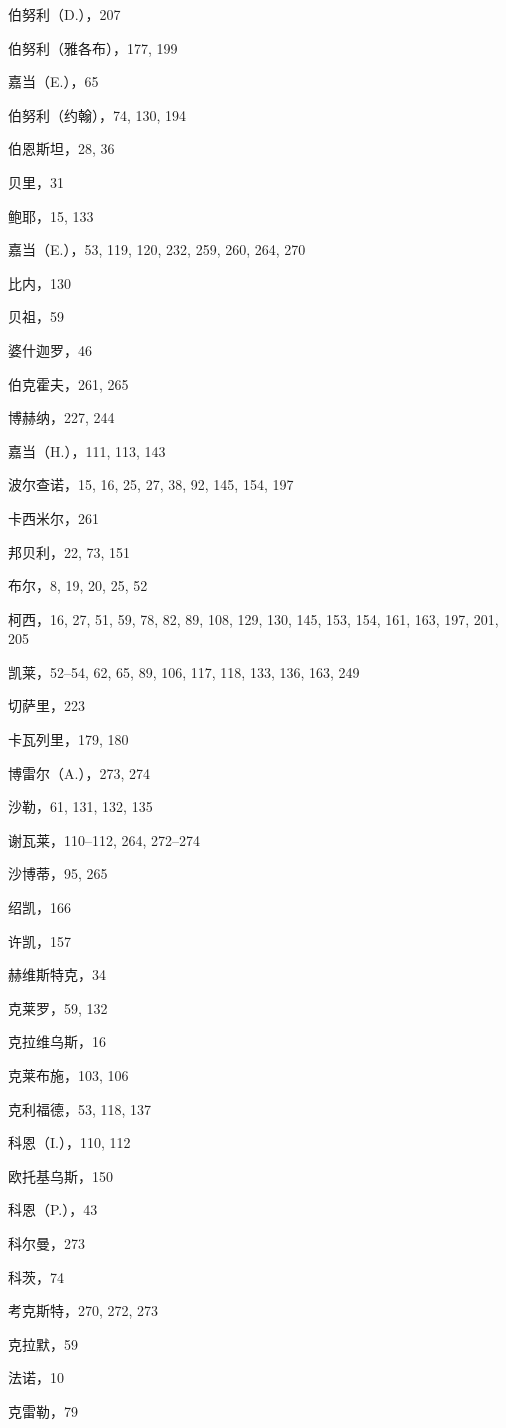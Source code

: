 伯努利（D.），207

伯努利（雅各布），177, 199

嘉当（E.），65

伯努利（约翰），74, 130, 194

伯恩斯坦，28, 36

贝里，31

鲍耶，15, 133

嘉当（E.），53, 119, 120, 232, 259, 260, 264, 270

比内，130

贝祖，59

婆什迦罗，46

伯克霍夫，261, 265

博赫纳，227, 244

嘉当（H.），111, 113, 143

波尔查诺，15, 16, 25, 27, 38, 92, 145, 154, 197

卡西米尔，261

邦贝利，22, 73, 151

布尔，8, 19, 20, 25, 52

柯西，16, 27, 51, 59, 78, 82, 89, 108, 129, 130, 145, 153, 154, 161, 163, 197, 201, 205

凯莱，52--54, 62, 65, 89, 106, 117, 118, 133, 136, 163, 249

切萨里，223

卡瓦列里，179, 180

博雷尔（A.），273, 274

沙勒，61, 131, 132, 135

谢瓦莱，110--112, 264, 272--274

沙博蒂，95, 265

绍凯，166

许凯，157

赫维斯特克，34

克莱罗，59, 132

克拉维乌斯，16

克莱布施，103, 106

克利福德，53, 118, 137

科恩（I.），110, 112

欧托基乌斯，150

科恩（P.），43

科尔曼，273

科茨，74

考克斯特，270, 272, 273

克拉默，59

法诺，10

克雷勒，79

